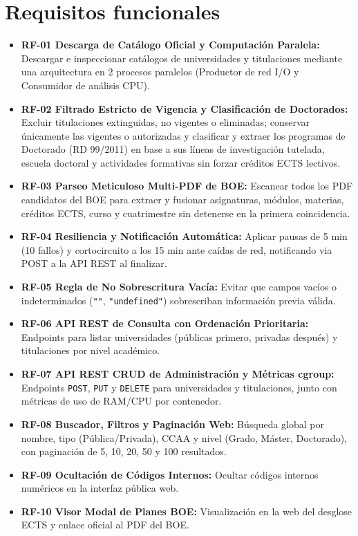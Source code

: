 \section{Requisitos funcionales}
\begin{itemize}
    \item \textbf{RF-01 Descarga de Catálogo Oficial y Computación Paralela:} Descargar e inspeccionar catálogos de universidades y titulaciones mediante una arquitectura en 2 procesos paralelos (Productor de red I/O y Consumidor de análisis CPU).
    \item \textbf{RF-02 Filtrado Estricto de Vigencia y Clasificación de Doctorados:} Excluir titulaciones extinguidas, no vigentes o eliminadas; conservar únicamente las vigentes o autorizadas y clasificar y extraer los programas de Doctorado (RD 99/2011) en base a sus líneas de investigación tutelada, escuela doctoral y actividades formativas sin forzar créditos ECTS lectivos.
    \item \textbf{RF-03 Parseo Meticuloso Multi-PDF de BOE:} Escanear todos los PDF candidatos del BOE para extraer y fusionar asignaturas, módulos, materias, créditos ECTS, curso y cuatrimestre sin detenerse en la primera coincidencia.
    \item \textbf{RF-04 Resiliencia y Notificación Automática:} Aplicar pausas de 5 min (10 fallos) y cortocircuito a los 15 min ante caídas de red, notificando via POST a la API REST al finalizar.
    \item \textbf{RF-05 Regla de No Sobrescritura Vacía:} Evitar que campos vacíos o indeterminados (\texttt{""}, \texttt{"undefined"}) sobrescriban información previa válida.
    \item \textbf{RF-06 API REST de Consulta con Ordenación Prioritaria:} Endpoints para listar universidades (públicas primero, privadas después) y titulaciones por nivel académico.
    \item \textbf{RF-07 API REST CRUD de Administración y Métricas cgroup:} Endpoints \texttt{POST}, \texttt{PUT} y \texttt{DELETE} para universidades y titulaciones, junto con métricas de uso de RAM/CPU por contenedor.
    \item \textbf{RF-08 Buscador, Filtros y Paginación Web:} Búsqueda global por nombre, tipo (Pública/Privada), CCAA y nivel (Grado, Máster, Doctorado), con paginación de 5, 10, 20, 50 y 100 resultados.
    \item \textbf{RF-09 Ocultación de Códigos Internos:} Ocultar códigos internos numéricos en la interfaz pública web.
    \item \textbf{RF-10 Visor Modal de Planes BOE:} Visualización en la web del desglose ECTS y enlace oficial al PDF del BOE.

\end{itemize}
